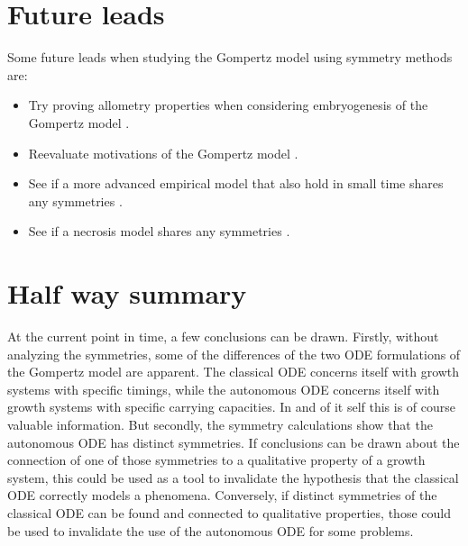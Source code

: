\section{Future leads}

Some future leads when studying the Gompertz model using symmetry methods are:
\begin{itemize}
  \item Try proving allometry properties when considering embryogenesis of the Gompertz model \cite{deakin1970allometry}.
  \item Reevaluate motivations of the Gompertz model \cite{bajzer1997tumor}.
  \item See if a more advanced empirical model that also hold in small time shares any symmetries \cite{frenzen1986justification}.
  \item See if a necrosis model shares any symmetries \cite{milotti2012interplay}.
\end{itemize}

\section{Half way summary}

At the current point in time, a few conclusions can be drawn.
Firstly, without analyzing the symmetries, some of the differences of the two ODE formulations of the Gompertz model are apparent.
The classical ODE concerns itself with growth systems with specific timings, while the autonomous ODE concerns itself with growth systems with specific carrying capacities.
In and of it self this is of course valuable information.
But secondly, the symmetry calculations show that the autonomous ODE has distinct symmetries.
If conclusions can be drawn about the connection of one of those symmetries to a qualitative property of a growth system, this could be used as a tool to invalidate the hypothesis that the classical ODE correctly models a phenomena.
Conversely, if distinct symmetries of the classical ODE can be found and connected to qualitative properties, those could be used to invalidate the use of the autonomous ODE for some problems.

